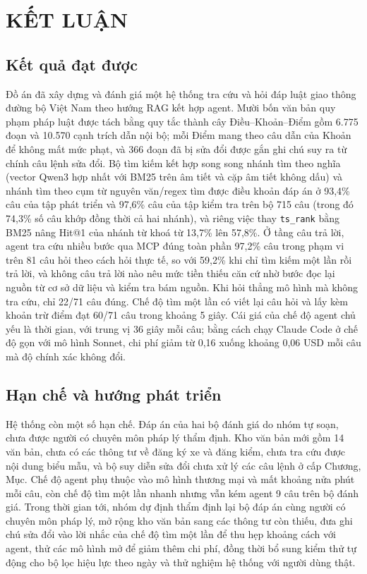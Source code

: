 \chapter*{KẾT LUẬN}

\section*{Kết quả đạt được}

Đồ án đã xây dựng và đánh giá một hệ thống tra cứu và hỏi đáp luật giao thông đường bộ Việt Nam theo hướng RAG kết hợp agent. Mười bốn văn bản quy phạm pháp luật được tách bằng quy tắc thành cây Điều--Khoản--Điểm gồm 6.775 đoạn và 10.570 cạnh trích dẫn nội bộ; mỗi Điểm mang theo câu dẫn của Khoản để không mất mức phạt, và 366 đoạn đã bị sửa đổi được gắn ghi chú suy ra từ chính câu lệnh sửa đổi. Bộ tìm kiếm kết hợp song song nhánh tìm theo nghĩa (vector Qwen3 hợp nhất với BM25 trên âm tiết và cặp âm tiết không dấu) và nhánh tìm theo cụm từ nguyên văn/regex tìm được điều khoản đáp án ở 93,4\% câu của tập phát triển và 97,6\% câu của tập kiểm tra trên bộ 715 câu (trong đó 74,3\% số câu khớp đồng thời cả hai nhánh), và riêng việc thay \texttt{ts\_rank} bằng BM25 nâng Hit@1 của nhánh từ khoá từ 13,7\% lên 57,8\%. Ở tầng câu trả lời, agent tra cứu nhiều bước qua MCP đúng toàn phần 97,2\% câu trong phạm vi trên 81 câu hỏi theo cách hỏi thực tế, so với 59,2\% khi chỉ tìm kiếm một lần rồi trả lời, và không câu trả lời nào nêu mức tiền thiếu căn cứ nhờ bước đọc lại nguồn từ cơ sở dữ liệu và kiểm tra bám nguồn. Khi hỏi thẳng mô hình mà không tra cứu, chỉ 22/71 câu đúng. Chế độ tìm một lần có viết lại câu hỏi và lấy kèm khoản trừ điểm đạt 60/71 câu trong khoảng 5 giây. Cái giá của chế độ agent chủ yếu là thời gian, với trung vị 36 giây mỗi câu; bằng cách chạy Claude Code ở chế độ gọn với mô hình Sonnet, chi phí giảm từ 0,16 xuống khoảng 0,06 USD mỗi câu mà độ chính xác không đổi.

\section*{Hạn chế và hướng phát triển}

Hệ thống còn một số hạn chế. Đáp án của hai bộ đánh giá do nhóm tự soạn, chưa được người có chuyên môn pháp lý thẩm định. Kho văn bản mới gồm 14 văn bản, chưa có các thông tư về đăng ký xe và đăng kiểm, chưa tra cứu được nội dung biểu mẫu, và bộ suy diễn sửa đổi chưa xử lý các câu lệnh ở cấp Chương, Mục. Chế độ agent phụ thuộc vào mô hình thương mại và mất khoảng nửa phút mỗi câu, còn chế độ tìm một lần nhanh nhưng vẫn kém agent 9 câu trên bộ đánh giá. Trong thời gian tới, nhóm dự định thẩm định lại bộ đáp án cùng người có chuyên môn pháp lý, mở rộng kho văn bản sang các thông tư còn thiếu, đưa ghi chú sửa đổi vào lời nhắc của chế độ tìm một lần để thu hẹp khoảng cách với agent, thử các mô hình mở để giảm thêm chi phí, đồng thời bổ sung kiểm thử tự động cho bộ lọc hiệu lực theo ngày và thử nghiệm hệ thống với người dùng thật.
